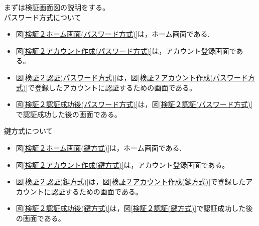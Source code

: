     まずは検証画面図の説明をする。\\
    パスワード方式について
    \begin{itemize}
        \item 図\ref{検証２ホーム画面(パスワード方式)}は，ホーム画面である.
        \item 図\ref{検証２アカウント作成(パスワード方式)}は，アカウント登録画面である。
        \item 図\ref{検証２認証(パスワード方式)}は，図\ref{検証２アカウント作成(パスワード方式)}で登録したアカウントに認証するための画面である。
        \item 図\ref{検証２認証成功後(パスワード方式)}は，図\ref{検証２認証(パスワード方式)}で認証成功した後の画面である。
    \end{itemize}
    鍵方式について\\
    \begin{itemize}
        \item 図\ref{検証２ホーム画面(鍵方式)}は，ホーム画面である.
        \item 図\ref{検証２アカウント作成(鍵方式)}は，アカウント登録画面である。
        \item 図\ref{検証２認証(鍵方式)}は，図\ref{検証２アカウント作成(鍵方式)}で登録したアカウントに認証するための画面である。
        \item 図\ref{検証２認証成功後(鍵方式)}は，図\ref{検証２認証(鍵方式)}で認証成功した後の画面である。
    \end{itemize}







